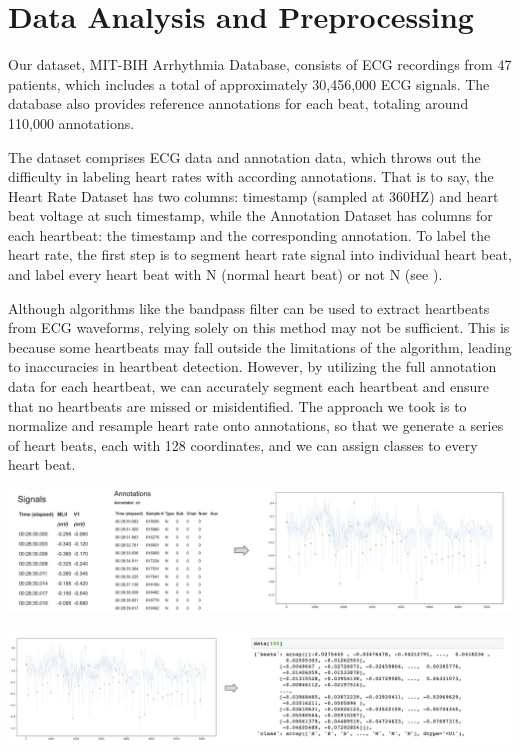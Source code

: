 \section{Data Analysis and Preprocessing}

Our dataset, MIT-BIH Arrhythmia Database, consists of ECG recordings from 47 patients, which includes a total of approximately 30,456,000 ECG signals. The database also provides reference annotations for each beat, totaling around 110,000 annotations.

The dataset comprises ECG data and annotation data, which throws out the difficulty in labeling heart rates with according annotations. That is to say, the Heart Rate Dataset has two columns: timestamp (sampled at 360HZ) and heart beat voltage at such timestamp, while the Annotation Dataset has columns for each heartbeat: the timestamp and the corresponding annotation. To label the heart rate, the first step is to segment heart rate signal into individual heart beat, and label every heart beat with N (normal heart beat) or not N (see \cite{arrhythmia_types}). 

\nocite{physionet}
\nocite{goldberger2000physiobank}

Although algorithms like the bandpass filter can be used to extract heartbeats from ECG waveforms, relying solely on this method may not be sufficient. This is because some heartbeats may fall outside the limitations of the algorithm, leading to inaccuracies in heartbeat detection. However, by utilizing the full annotation data for each heartbeat, we can accurately segment each heartbeat and ensure that no heartbeats are missed or misidentified. The approach we took is to normalize and resample heart rate onto annotations, so that we generate a series of heart beats, each with 128 coordinates, and we can assign classes to every heart beat.
\begin{center}
    \includegraphics[width=\textwidth]{latex-images/Sub-figures_Example/feature-engineering-1.png}
\end{center}

\begin{center}
    \includegraphics[width=\textwidth]{latex-images/Sub-figures_Example/feature-engineering-2.png}
\end{center}

\nocite{Arrhythmia_Monitoring_System}
